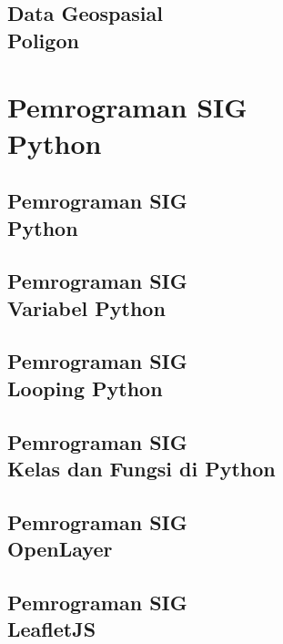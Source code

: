 \documentclass{WileySix}
\begin{document}
\chapter[Shapefile Poligon]
{Data Geospasial\\ Poligon}



\part[Pemrograman SIG]
{Pemrograman SIG\\ Python}

\chapter[Python]
{Pemrograman SIG\\ Python}


\chapter[Variabel]
{Pemrograman SIG\\ Variabel Python}



\chapter[Looping]
{Pemrograman SIG\\ Looping Python}


\chapter[Kelas dan Fungsi di Python]
{Pemrograman SIG\\ Kelas dan Fungsi di Python}


\chapter[OpenLayer]
{Pemrograman SIG\\ OpenLayer}


\chapter[LeafletJS]
{Pemrograman SIG\\ LeafletJS}

\end{document}
